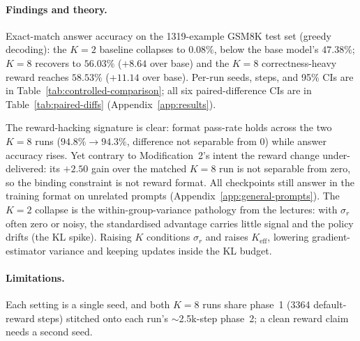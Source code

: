 \paragraph{Findings and theory.}
Exact-match answer accuracy on the 1319-example GSM8K test set (greedy decoding): the $K=2$ baseline
collapses to $0.08\%$, below the base model's $47.38\%$; $K=8$ recovers to $56.03\%$ ($+8.64$ over
base) and the $K=8$ correctness-heavy reward reaches $58.53\%$ ($+11.14$ over base). Per-run seeds,
steps, and 95\% CIs are in Table~\ref{tab:controlled-comparison}; all six paired-difference CIs are in
Table~\ref{tab:paired-diffs} (Appendix~\ref{app:results}).

The reward-hacking signature is clear: format pass-rate holds across the two $K=8$ runs
($94.8\%\to94.3\%$, difference not separable from 0) while answer accuracy rises. Yet contrary to
Modification~2's intent the reward change under-delivered: its $+2.50$ gain over the matched $K=8$ run
is not separable from zero, so the binding constraint is not reward format. All checkpoints still
answer in the training format on unrelated prompts (Appendix~\ref{app:general-prompts}). The $K=2$
collapse is the within-group-variance pathology from the lectures: with $\sigma_r$ often zero or noisy,
the standardised advantage carries little signal and the policy drifts (the KL spike). Raising $K$
conditions $\sigma_r$ and raises $K_{\mathrm{eff}}$, lowering gradient-estimator variance and keeping
updates inside the KL budget.

\paragraph{Limitations.}
Each setting is a single seed, and both $K=8$ runs share phase~1 (3364 default-reward steps) stitched
onto each run's $\sim$2.5k-step phase~2; a clean reward claim needs a second seed.
